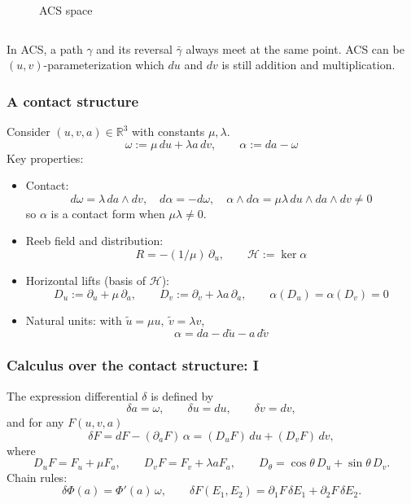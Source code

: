 \documentclass[aspectratio=169]{beamer}
\begin{document}
\begin{frame}
\begin{columns}
\begin{column}{0.6\textwidth}
\begin{figure}[ht]
            \caption{ACS space}
            \end{figure}
        \end{column}
    \end{columns}
    \begin{center}
    In ACS, a path $\gamma$ and its reversal $\bar{\gamma}$ always meet at the same point. \newline
    ACS can be $(u, v)$-parameterization which $du$ and $dv$ is still addition and multiplication.
    \end{center}
\end{frame}


\begin{frame}
    \frametitle{A contact structure}
    Consider $(u,v,a)\in\mathbb{R}^3$ with constants $\mu,\lambda$.
    \[
      \omega := \mu\,du + \lambda a\,dv,\qquad \alpha := da - \omega
    \]
    Key properties:
    \begin{itemize}
      \item Contact:
      \[
        d\omega=\lambda\,da\wedge dv,\quad d\alpha=-d\omega,\quad
        \alpha\wedge d\alpha=\mu\lambda\,du\wedge da\wedge dv\neq 0
      \]
      so $\alpha$ is a contact form when $\mu\lambda\neq 0$.
      \item Reeb field and distribution:
      \[
        R=-(1/\mu)\,\partial_u,\qquad \mathcal{H}:=\ker\alpha
      \]
      \item Horizontal lifts (basis of $\mathcal{H}$):
      \[
        D_u:=\partial_u+\mu\,\partial_a,\qquad
        D_v:=\partial_v+\lambda a\,\partial_a,\qquad \alpha(D_u)=\alpha(D_v)=0
      \]
      \item Natural units: with $\tilde u=\mu u,\ \tilde v=\lambda v$,
      \[
        \alpha=da-d\tilde u-a\,d\tilde v
      \]
    \end{itemize}
\end{frame}

\begin{frame}
    \frametitle{Calculus over the contact structure: I}
    The expression differential $\delta$ is defined by
    \[
      \delta a=\omega,\qquad \delta u=du,\qquad \delta v=dv,
    \]
    and for any $F(u,v,a)$
    \[
      \delta F = dF - (\partial_a F)\,\alpha
      = (D_uF)\,du + (D_vF)\,dv,
    \]
    where
    \[
      D_uF=F_u+\mu F_a,\qquad D_vF=F_v+\lambda a F_a,\qquad
      D_\theta=\cos\theta\,D_u+\sin\theta\,D_v.
    \]
    Chain rules:
    \[
      \delta\Phi(a)=\Phi'(a)\,\omega,\qquad
      \delta F(E_1,E_2)=\partial_1F\,\delta E_1+\partial_2F\,\delta E_2.
    \]
\end{frame}
\end{document}
